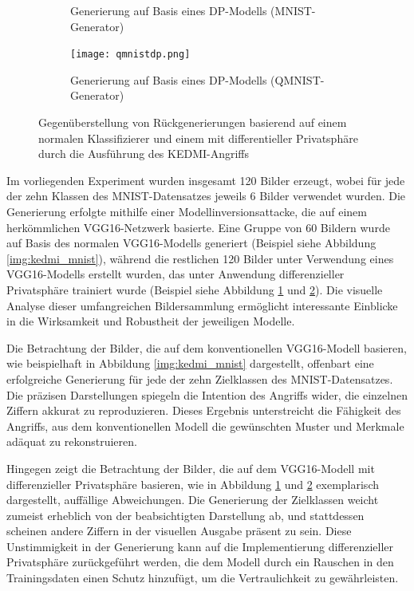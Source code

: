 \begin{figure}[H]
\begin{subfigure}[b]{0.35\linewidth}
		\caption{Generierung auf Basis eines DP-Modells (MNIST-Generator)}
		\label{img:kedmi_mnist_dp}
	\end{subfigure}
	\begin{subfigure}[b]{\textwidth}
		\centering
		\texttt{[image: qmnistdp.png]}
		\caption{Generierung auf Basis eines DP-Modells (QMNIST-Generator)}
		\label{img:qmnistdp}
	\end{subfigure}
	\caption{Gegenüberstellung von Rückgenerierungen basierend auf einem normalen Klassifizierer und einem mit differentieller Privatsphäre durch die Ausführung des \glqq KEDMI\grqq-Angriffs}
	\label{img:kedmi_dpvsnorm}
\end{figure}

Im vorliegenden Experiment wurden insgesamt 120 Bilder erzeugt, wobei für jede der zehn Klassen des MNIST-Datensatzes jeweils 6 Bilder verwendet wurden. Die Generierung erfolgte mithilfe einer Modellinversionsattacke, die auf einem herkömmlichen VGG16-Netzwerk basierte. Eine Gruppe von 60 Bildern wurde auf Basis des normalen VGG16-Modells generiert (Beispiel siehe Abbildung \ref{img:kedmi_mnist}), während die restlichen 120 Bilder unter Verwendung eines VGG16-Modells erstellt wurden, das unter Anwendung differenzieller Privatsphäre trainiert wurde (Beispiel siehe Abbildung \ref{img:kedmi_mnist_dp} und \ref{img:qmnistdp}). Die visuelle Analyse dieser umfangreichen Bildersammlung ermöglicht interessante Einblicke in die Wirksamkeit und Robustheit der jeweiligen Modelle.

Die Betrachtung der Bilder, die auf dem konventionellen VGG16-Modell basieren, wie beispielhaft in Abbildung \ref{img:kedmi_mnist} dargestellt, offenbart eine erfolgreiche Generierung für jede der zehn Zielklassen des MNIST-Datensatzes. Die präzisen Darstellungen spiegeln die Intention des Angriffs wider, die einzelnen Ziffern akkurat zu reproduzieren. Dieses Ergebnis unterstreicht die Fähigkeit des Angriffs, aus dem konventionellen Modell die gewünschten Muster und Merkmale adäquat zu rekonstruieren.

Hingegen zeigt die Betrachtung der Bilder, die auf dem VGG16-Modell mit differenzieller Privatsphäre basieren, wie in Abbildung \ref{img:kedmi_mnist_dp} und \ref{img:qmnistdp} exemplarisch dargestellt, auffällige Abweichungen. Die Generierung der Zielklassen weicht zumeist erheblich von der beabsichtigten Darstellung ab, und stattdessen scheinen andere Ziffern in der visuellen Ausgabe präsent zu sein. Diese Unstimmigkeit in der Generierung kann auf die Implementierung differenzieller Privatsphäre zurückgeführt werden, die dem Modell durch ein Rauschen in den Trainingsdaten einen Schutz hinzufügt, um die Vertraulichkeit zu gewährleisten.

